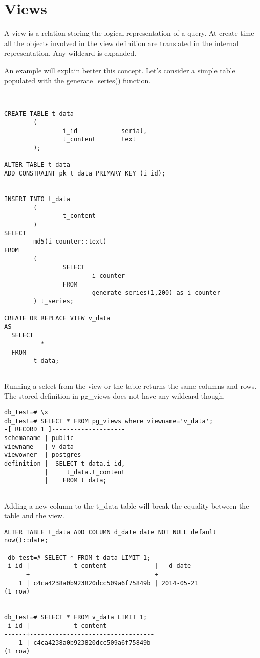 \section{Views}
\label{sec:VIEWS}
A view is a relation storing the logical representation of a query. At create time all the objects
involved in the view definition are translated in the internal representation. Any wildcard is
expanded.

An example will explain better this concept. Let's consider a simple table populated with the
generate\_series() function.

\begin{lstlisting}[style=pgsql]


CREATE TABLE t_data 
        ( 
                i_id            serial,
                t_content       text
        );

ALTER TABLE t_data 
ADD CONSTRAINT pk_t_data PRIMARY KEY (i_id);


INSERT INTO t_data
        (
                t_content
        )
SELECT
        md5(i_counter::text)
FROM
        (
                SELECT
                        i_counter
                FROM
                        generate_series(1,200) as i_counter
        ) t_series;

CREATE OR REPLACE VIEW v_data 
AS 
  SELECT 
          *
  FROM 
        t_data;


\end{lstlisting}

Running a select from the view or the table returns the same columns and rows.
The stored definition in pg\_views does not have any wildcard though.


\begin{lstlisting}[style=pgsql]
db_test=# \x
db_test=# SELECT * FROM pg_views where viewname='v_data';
-[ RECORD 1 ]--------------------
schemaname | public
viewname   | v_data
viewowner  | postgres
definition |  SELECT t_data.i_id,
           |     t_data.t_content
           |    FROM t_data;


\end{lstlisting}

Adding a new column to the t\_data table will break the equality between the table and the view.

\begin{lstlisting}[style=pgsql]
 ALTER TABLE t_data ADD COLUMN d_date date NOT NULL default now()::date;
 
 db_test=# SELECT * FROM t_data LIMIT 1;
 i_id |            t_content             |   d_date   
------+----------------------------------+------------
    1 | c4ca4238a0b923820dcc509a6f75849b | 2014-05-21
(1 row)


db_test=# SELECT * FROM v_data LIMIT 1;
 i_id |            t_content             
------+----------------------------------
    1 | c4ca4238a0b923820dcc509a6f75849b
(1 row)


 
\end{lstlisting}

